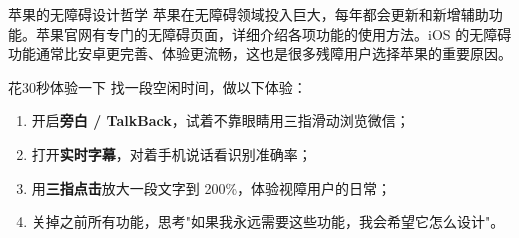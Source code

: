 \begin{tcbinfo}{苹果的无障碍设计哲学}
苹果在无障碍领域投入巨大，每年都会更新和新增辅助功能。苹果官网有专门的无障碍页面，详细介绍各项功能的使用方法。iOS 的无障碍功能通常比安卓更完善、体验更流畅，这也是很多残障用户选择苹果的重要原因。

\end{tcbinfo}

\begin{tcbpractice}{花30秒体验一下}
找一段空闲时间，做以下体验：

\begin{enumerate}
  \item 开启\textbf{旁白 / TalkBack}，试着不靠眼睛用三指滑动浏览微信；
  \item 打开\textbf{实时字幕}，对着手机说话看识别准确率；
  \item 用\textbf{三指点击}放大一段文字到 200\%，体验视障用户的日常；
  \item 关掉之前所有功能，思考"如果我永远需要这些功能，我会希望它怎么设计"。
\end{enumerate}

\end{tcbpractice}
